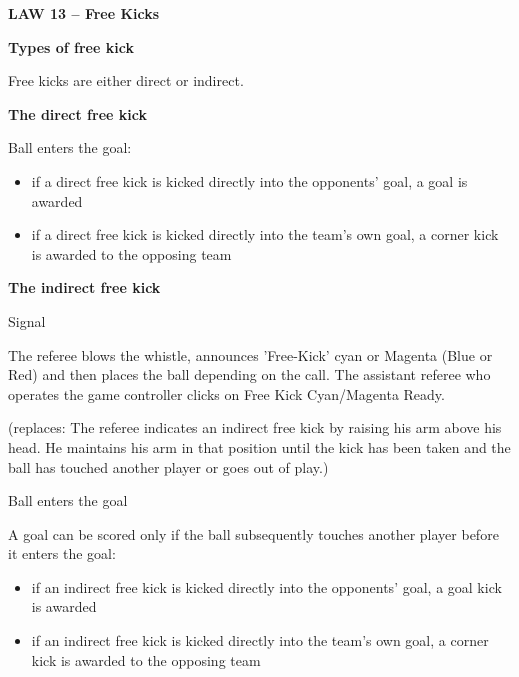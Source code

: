 \clearpage
\sffamily
{\bfseries\textcolor[rgb]{0.4,0.4,0.4}{LAW 13 -- Free Kicks} }
{\color{magenta}

\bigskip

{\bfseries Types of free kick}

\headlinebox

Free kicks are either direct or indirect.

\bigskip

{\bfseries The direct free kick }

\headlinebox

Ball enters the goal:

\begin{itemize}
\item if a direct free kick is kicked directly into the
opponents{\textquoteright} goal, a goal is awarded
\item if a direct free kick is kicked directly into the team's own goal, a corner kick is awarded to the opposing team
\end{itemize}

\bigskip

{\bfseries The indirect free kick}

\headlinebox

Signal

The referee blows the whistle, announces 'Free-Kick' cyan or Magenta (Blue or Red) and then  places the ball depending on the call. The assistant referee who operates the game controller clicks on Free Kick Cyan/Magenta Ready. 

\textcolor[rgb]{0.4,0.4,0.4}{(replaces:
The referee indicates an indirect free kick by raising his arm above his head. He maintains his arm in that position until the kick has been taken and the ball has touched another player or goes out of play.)}


\bigskip

Ball enters the goal

A goal can be scored only if the ball subsequently touches another player before it enters the goal:

\begin{itemize}
\item if an indirect free kick is kicked directly into the
opponents' goal, a goal kick is awarded
\item if an indirect free kick is kicked directly into the
team's own goal, a corner kick is awarded to the
opposing team
\end{itemize}

}

